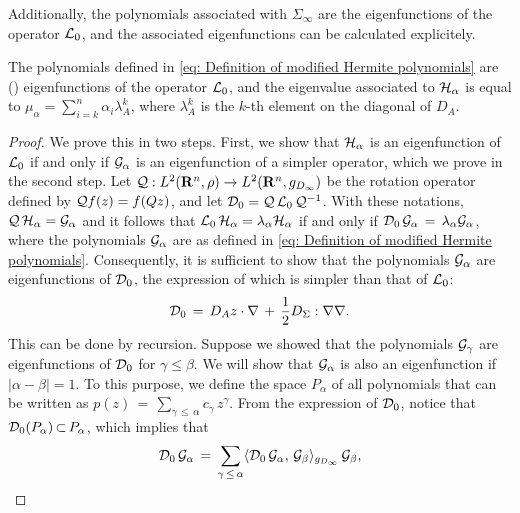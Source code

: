 Additionally, the polynomials associated with $\Sigma_\infty$ are the
eigenfunctions of the operator $\op L_0$, and the associated eigenfunctions can
be calculated explicitely.
\begin{lemma}[Eigenfunctions of $\op L_0$]
    The polynomials defined in \eqref{eq: Definition of modified Hermite
    polynomials} are () eigenfunctions of the operator $\op L_0$, and
    the eigenvalue associated to $\mathcal H_{\alpha}$ is equal to
    $\mu_{\alpha}=\sum_{i=k}^n \alpha_i \lambda_A^k$, where $\lambda_A^k$ is the $k$-th
    element on the diagonal of $D_A$.
\end{lemma}

\iflong \begin{proof}
    We prove this in two steps. First, we show that $\mathcal H_\alpha$ is an
    eigenfunction of $\op L_0$ if and only if $\mathcal G_\alpha$ is an
    eigenfunction of a simpler operator, which we prove in the second step. Let
    $\mathcal Q: L^2(\mathbf R^n, \rho) \rightarrow L^2(\mathbf R^n, g_{D_\infty})$ be the
    rotation operator defined by $\mathcal Q f (z) = f(Qz)$, and let $\mathcal D_0 = \mathcal Q \,
    \mathcal L_0 \, \mathcal Q^{-1}$. With these notations, $\mathcal Q \, \mathcal H_\alpha =
    \mathcal G_\alpha$ and it follows that $\mathcal L_0 \, \mathcal H_\alpha = \lambda_\alpha  \mathcal
    H_\alpha$ if and only if $\mathcal D_0 \, \mathcal G_\alpha \,=\, \lambda_\alpha
    \mathcal G_\alpha$, where the polynomials $\mathcal G_{\alpha}$ are as
    defined in \eqref{eq: Definition of modified Hermite polynomials}.
    Consequently, it is sufficient to show that the polynomials $\mathcal
    G_\alpha$ are eigenfunctions of $\mathcal D_0$, the expression of which is simpler
    than that of $\op L_0$:
    $$ \mathcal D_0 \,=\, D_A z \cdot \nabla \,+\, \frac{1}{2}D_{\Sigma}:\nabla\nabla. $$
    This can be done by recursion. Suppose we showed that the polynomials $\mathcal
    G_{\gamma}$ are eigenfunctions of $\mathcal D_0$ for $\gamma \leq \beta$. We
    will show that $\mathcal G_{\alpha}$ is also an eigenfunction if
    $|{\alpha}-{\beta}| = 1$. To this purpose, we define the space $P_{\alpha}$ of
    all polynomials that can be written as $p(z) \,=\, {\sum}_{{\gamma}\, {\leq}
    \,{\alpha}} c_{\gamma}\, z^{\gamma}$. From the expression of $\mathcal D_0$,
    notice that $\mathcal D_0(P_{\alpha}) \,{\subset}\,P_{\alpha}$, which implies that
    $$
        \mathcal D_0 \, \mathcal G_{\alpha}\,=\, \sum_{\gamma\, \leq \, \alpha} \langle \mathcal
        D_0\,\mathcal G_{\alpha},\, \mathcal G_{\beta}\rangle_{g_{D_{\infty}}}\, \mathcal
        G_{\beta},
    $$

\end{proof}

